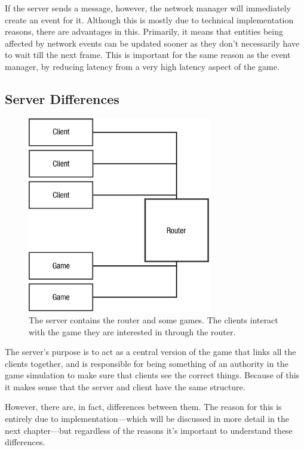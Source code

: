 If the server sends a message, however, the network manager will immediately create an event for it. Although this is mostly due to technical implementation reasons, there are advantages in this. Primarily, it means that entities being affected by network events can be updated sooner as they don't necessarily have to wait till the next frame. This is important for the same reason as the event manager, by reducing latency from a very high latency aspect of the game.

\subsection{Server Differences}

\begin{figure}[H]
	\centering
	\includegraphics[width=8cm]{Images/server_design.eps}
	\caption{The server contains the router and some games. The clients interact with the game they are interested in through the router.}
    \label{fig:server_design}
\end{figure}


The server's purpose is to act as a central version of the game that links all the clients together, and is responsible for being something of an authority in the game simulation to make sure that clients see the correct things. Because of this it makes sense that the server and client have the same structure.

However, there are, in fact, differences between them. The reason for this is entirely due to implementation---which will be discussed in more detail in the next chapter---but regardless of the reasons it's important to understand these differences.

